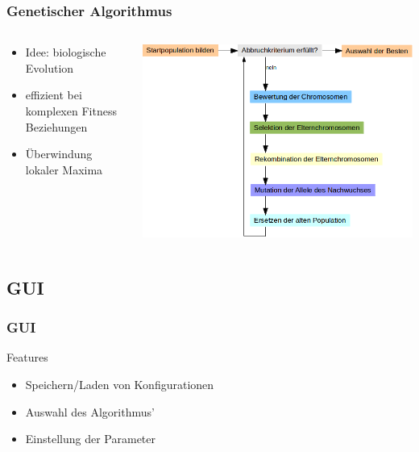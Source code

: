 \begin{frame}
  \frametitle{Genetischer Algorithmus}
  \begin{columns}[T]
    \begin{column}{0.35\textwidth}
      \begin{itemize}
      \item Idee: biologische Evolution
      \item effizient bei komplexen Fitness Beziehungen
      \item Überwindung lokaler Maxima
      \end{itemize}
    \end{column}
    \begin{column}{0.65\textwidth}
        \includegraphics[width=\textwidth]{GenAlg-Diagramm.png}
    \end{column}
  \end{columns}
\end{frame}


\subsection{GUI}

\begin{frame}
  \frametitle{GUI}
  \begin{block}{Features}
    \begin{itemize}
    \item Speichern/Laden von Konfigurationen
    \item Auswahl des Algorithmus'
    \item Einstellung der Parameter
    \end{itemize}
  \end{block}
\end{frame}

